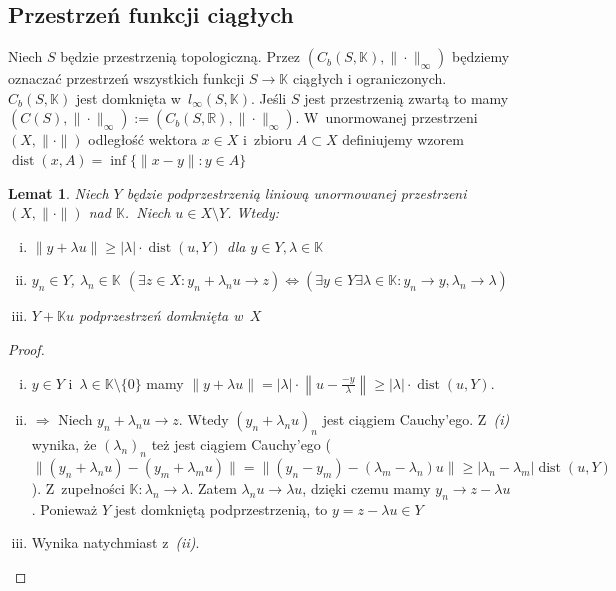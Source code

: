 \documentclass[11pt]{mwrep}
\renewcommand{\[}{\begin{equation}}
\renewcommand{\]}{\end{equation}}
\newcommand{\R}{{\ensuremath{\mathbb R}}}
\newcommand{\K}{\ensuremath{\mathbb{K}}}
\newcommand{\dist}{\operatorname{dist}}
\newcommand{\norm}{\|\cdot\|}
\newtheorem{lem}[subsection]{Lemat}
\newcounter{numer}
\begin{document}
\subsection{Przestrzeń funkcji ciągłych}
Niech $S$ będzie przestrzenią topologiczną. Przez $(C_b (S, \K), \|\cdot\|_\infty )$ będziemy oznaczać przestrzeń wszystkich funkcji $S\to\K$ ciągłych i ograniczonych.
$C_b(S,\K)$ jest domknięta w~$l_\infty(S,\K)$. Jeśli $S$ jest przestrzenią zwartą to mamy $(C(S), \|\cdot\|_\infty) := (C_b (S,\R) , \|\cdot\|_\infty)$.
W~unormowanej przestrzeni $(X,\|\cdot\|)$ odległość wektora $x\in X$ i~zbioru $A\subset X$ definiujemy wzorem $\dist(x,A) = \inf \{\|x-y\|: y \in A\}$
\begin{lem}
  \label{lem1}
  	Niech $Y$ będzie podprzestrzenią liniową unormowanej przestrzeni $(X,\norm)$ nad \K.~Niech $u\in X\setminus Y$. Wtedy:
	\begin{enumerate}[(i)]
		\item $\|y+\lambda u \| \ge |\lambda| \cdot \dist(u,Y)$ dla $y\in Y, \lambda \in \K$
		\item $y_n \in Y$, $\lambda_n \in \K$ 
			$\left(\exists z \in X: y_n + \lambda_n u \to z \right) \Leftrightarrow 
			\left( \exists y\in Y \exists \lambda \in \K: y_n \to y, \lambda_n \to \lambda  \right)$
		\item $Y+\K u$ podprzestrzeń domknięta w~$X$
	\end{enumerate}

\end{lem}
\begin{proof}
	\begin{enumerate}[(i)]
	  \item $y\in Y$ i~$\lambda \in \K\setminus \{0\}$ mamy $\|y+\lambda u\|= |\lambda|\cdot \left\| u - \frac{-y}{\lambda}\right\|\ge |\lambda| \cdot \dist(u,Y)$.
		\item $\Rightarrow$ Niech $y_n + \lambda_n u \to z$. Wtedy  $(y_n + \lambda_n u )_n $ jest ciągiem Cauchy'ego. 
			Z~\textit{(i)} wynika, że $(\lambda_n)_n$ też jest ciągiem Cauchy'ego
			($\|(y_n +\lambda_n u ) - (y_m +\lambda_m u)\| = \|(y_n-y_m) - (\lambda_m-\lambda_n)u\| \ge |\lambda_n-\lambda_m| \dist(u,Y)$).
			Z~zupełności $\K: \lambda_n \to \lambda$.
			Zatem $\lambda_n u \to \lambda u$, dzięki czemu mamy $y_n \to z - \lambda u$. Ponieważ $Y$ jest domkniętą podprzestrzenią, to $y = z - \lambda u \in Y$
		\item Wynika natychmiast z~\textit{(ii)}. 
	\end{enumerate}
\end{proof}
\end{document}
